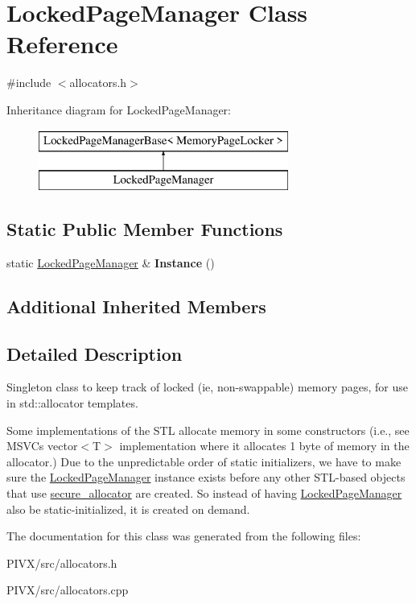 \hypertarget{class_locked_page_manager}{}\section{Locked\+Page\+Manager Class Reference}
\label{class_locked_page_manager}


{\ttfamily \#include $<$allocators.\+h$>$}

Inheritance diagram for Locked\+Page\+Manager\+:\begin{figure}[H]
\begin{center}
\leavevmode
\includegraphics[height=2.000000cm]{class_locked_page_manager}
\end{center}
\end{figure}
\subsection*{Static Public Member Functions}
\begin{DoxyCompactItemize}
\item 
\mbox{\label{class_locked_page_manager_ac9b1d42d240dba4714a35fff970b6dde}} 
static \mbox{\hyperlink{class_locked_page_manager}{Locked\+Page\+Manager}} \& {\bfseries Instance} ()
\end{DoxyCompactItemize}
\subsection*{Additional Inherited Members}


\subsection{Detailed Description}
Singleton class to keep track of locked (ie, non-\/swappable) memory pages, for use in std\+::allocator templates.

Some implementations of the S\+TL allocate memory in some constructors (i.\+e., see M\+S\+VC\textquotesingle{}s vector$<$\+T$>$ implementation where it allocates 1 byte of memory in the allocator.) Due to the unpredictable order of static initializers, we have to make sure the \mbox{\hyperlink{class_locked_page_manager}{Locked\+Page\+Manager}} instance exists before any other S\+T\+L-\/based objects that use \mbox{\hyperlink{structsecure__allocator}{secure\+\_\+allocator}} are created. So instead of having \mbox{\hyperlink{class_locked_page_manager}{Locked\+Page\+Manager}} also be static-\/initialized, it is created on demand. 

The documentation for this class was generated from the following files\+:\begin{DoxyCompactItemize}
\item 
P\+I\+V\+X/src/allocators.\+h\item 
P\+I\+V\+X/src/allocators.\+cpp\end{DoxyCompactItemize}

